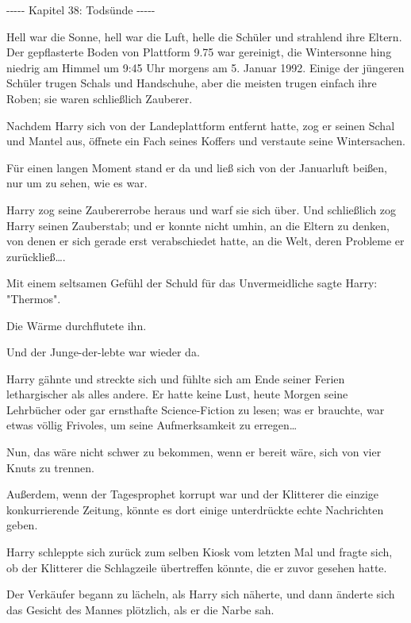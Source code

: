 

\hypertarget{todsuxfcnde}{%

-\/-\/-\/-\/- Kapitel 38: Todsünde -\/-\/-\/-\/-

Hell war die Sonne, hell war die Luft, helle die Schüler und strahlend ihre Eltern. Der gepflasterte Boden von Plattform 9.75 war gereinigt, die Wintersonne hing niedrig am Himmel um 9:45 Uhr morgens am 5. Januar 1992. Einige der jüngeren Schüler trugen Schals und Handschuhe, aber die meisten trugen einfach ihre Roben; sie waren schließlich Zauberer.

Nachdem Harry sich von der Landeplattform entfernt hatte, zog er seinen Schal und Mantel aus, öffnete ein Fach seines Koffers und verstaute seine Wintersachen.

Für einen langen Moment stand er da und ließ sich von der Januarluft beißen, nur um zu sehen, wie es war.

Harry zog seine Zaubererrobe heraus und warf sie sich über. Und schließlich zog Harry seinen Zauberstab; und er konnte nicht umhin, an die Eltern zu denken, von denen er sich gerade erst verabschiedet hatte, an die Welt, deren Probleme er zurückließ….

Mit einem seltsamen Gefühl der Schuld für das Unvermeidliche sagte Harry: "Thermos".

Die Wärme durchflutete ihn.

Und der Junge-der-lebte war wieder da.

Harry gähnte und streckte sich und fühlte sich am Ende seiner Ferien lethargischer als alles andere. Er hatte keine Lust, heute Morgen seine Lehrbücher oder gar ernsthafte Science-Fiction zu lesen; was er brauchte, war etwas völlig Frivoles, um seine Aufmerksamkeit zu erregen…

Nun, das wäre nicht schwer zu bekommen, wenn er bereit wäre, sich von vier Knuts zu trennen.

Außerdem, wenn der Tagesprophet korrupt war und der Klitterer die einzige konkurrierende Zeitung, könnte es dort einige unterdrückte echte Nachrichten geben.

Harry schleppte sich zurück zum selben Kiosk vom letzten Mal und fragte sich, ob der Klitterer die Schlagzeile übertreffen könnte, die er zuvor gesehen hatte.

Der Verkäufer begann zu lächeln, als Harry sich näherte, und dann änderte sich das Gesicht des Mannes plötzlich, als er die Narbe sah.

}
